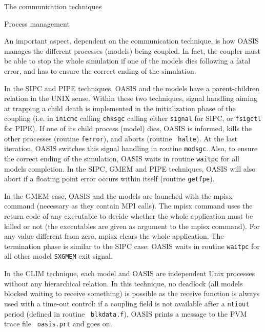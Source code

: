\begin{subsection}{The communication techniques}
\begin{subsubsection}{Process management}
\label{subsubsec_process}

An important aspect, dependent on the communication technique,
is how OASIS manages the different processes (models) being
coupled. In fact, the coupler must be able to stop the whole
simulation if one of the models dies following a fatal error, and has to
ensure the correct ending of the simulation. 

\vspace{0.4cm}

In the SIPC and PIPE techniques,
OASIS and the models have a parent-children relation in the UNIX sense.
 Within these two techniques, signal handling aiming at trapping a
child death is implemented in the initialization phase of the
coupling (i.e. in {\tt inicmc} calling {\tt chksgc} calling either
{\tt signal} for SIPC, or {\tt fsigctl} for PIPE). If one of its child
process (model) dies, OASIS is informed, kills the other
processes (routine {\tt ferror}), and aborts (routine {\tt
halte}). At the last iteration, OASIS switches this signal
handling in routine {\tt modsgc}. Also, to ensure the correct 
ending of the simulation, OASIS waits in routine {\tt waitpc} 
for all models completion. In the SIPC, GMEM and PIPE techniques, 
OASIS will also abort if a floating point error occurs within 
itself (routine {\tt getfpe}).

\vspace{0.4cm}

In the GMEM case, OASIS and the models are launched with the mpisx
command (necessary as they contain MPI calls). The mpisx command uses
the return code of any executable to decide
whether the whole application must be killed or not (the executables 
are given as argument to the mpisx command). For any value
different from zero, mpisx clears the whole application. The
termination phase is similar to the SIPC case: OASIS waits in routine
{\tt waitpc} for all other model {\tt SXGMEM} exit signal.

\vspace{0.4cm}

In the CLIM technique, each model and OASIS are independent Unix
processes without any hierarchical relation. In this technique, no
deadlock (all models blocked waiting to receive something) is possible
as the receive function is always used with a time-out control:
if a coupling field is not
available after a {\tt ntiout} period (defined in routine {\tt
blkdata.f}), OASIS prints a message to the PVM trace file {\tt
oasis.prt} and goes on.
\end{subsubsection}
\end{subsection}
